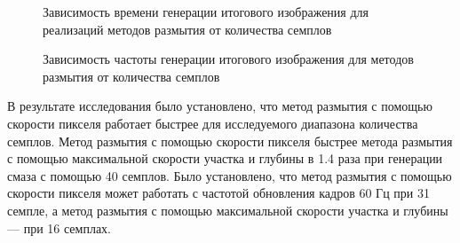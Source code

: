 \begin{figure}[H]
    \centering
    

    \caption{Зависимость времени генерации итогового изображения для реализаций методов размытия от количества семплов}
    \label{fig:plot_time}
\end{figure} 

\begin{figure}[H]
    \centering
    

    \caption{Зависимость частоты генерации итогового изображения для методов размытия от количества семплов}
    \label{fig:plot_fps}
\end{figure} 

В результате исследования было установлено, что метод размытия с помощью скорости пикселя работает быстрее для исследуемого диапазона количества семплов. Метод размытия с помощью скорости пикселя быстрее метода размытия с помощью максимальной скорости участка и глубины в 1.4 раза при генерации смаза с помощью 40 семплов. Было установлено, что метод размытия с помощью скорости пикселя может работать с частотой обновления кадров 60 Гц при 31 семпле, а метод размытия с помощью максимальной скорости участка и глубины --- при 16 семплах. 

